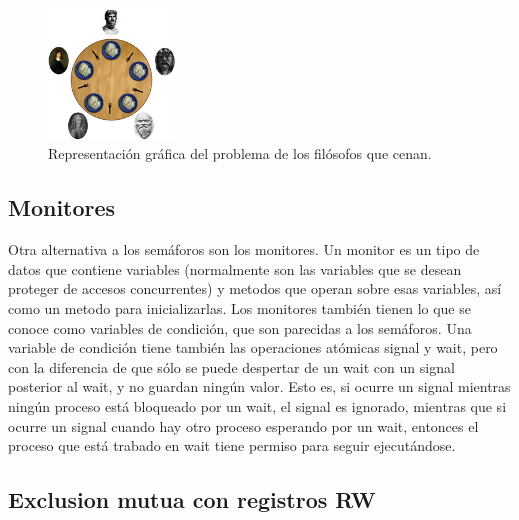 \documentclass{article}
\begin{document}
\begin{figure}[H]
    \centering
    \includegraphics[width=0.3\textwidth]{imgs/philosophers.png}
    \caption{Representación gráfica del problema de los filósofos que cenan.}
    \label{fig:philosophers}
\end{figure}


\subsection{Monitores}

Otra alternativa a los sem\'aforos son los monitores. Un monitor es un tipo de datos que contiene variables (normalmente son las variables que se desean proteger de accesos concurrentes) y metodos que operan sobre esas variables, as\'i como un metodo para inicializarlas. Los monitores tambi\'en tienen lo que se conoce como variables de condici\'on, que son parecidas a los sem\'aforos. Una variable de condici\'on tiene tambi\'en las operaciones at\'omicas signal y wait, pero con la diferencia de que s\'olo se puede despertar de un wait con un signal posterior al wait, y no guardan ning\'un valor. Esto es, si ocurre un signal mientras ning\'un proceso est\'a bloqueado por un wait, el signal es ignorado, mientras que si ocurre un signal cuando hay otro proceso esperando por un wait, entonces el proceso que est\'a trabado en wait tiene permiso para seguir ejecut\'andose.

\subsection{Exclusion mutua con registros RW}
\end{document}
